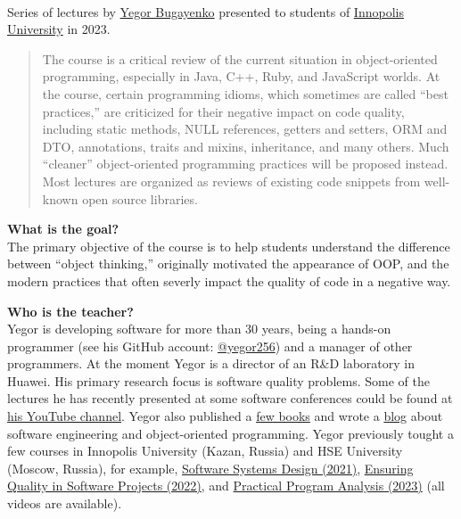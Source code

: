 \documentclass[nobrand,anonymous,nodate,nosecurity]{huawei}
\begin{document}
{\\
Series of lectures by \href{https://www.yegor256.com}{Yegor Bugayenko} presented
to students of \href{https://innopolis.university/en/}{Innopolis University} in 2023.


\begin{abstract}
The course is a critical review of the current situation in object-oriented programming,
especially in Java, C++, Ruby, and JavaScript worlds. At the course, certain programming
idioms, which sometimes are called ``best practices,'' are criticized for their
negative impact on code quality, including static methods, NULL references, getters
and setters, ORM and DTO, annotations, traits and mixins, inheritance, and many others.
Much ``cleaner'' object-oriented programming practices will be proposed instead. Most
lectures are organized as reviews of existing code snippets from well-known
open source libraries.
\end{abstract}


\textbf{What is the goal?}\\
The primary objective of the course is to help students understand the
difference between ``object thinking,'' originally motivated the
appearance of OOP, and the modern practices that often
severly impact the quality of code in a negative way.

\textbf{Who is the teacher?}\\
Yegor is developing software for more than 30 years, being a hands-on programmer
(see his GitHub account: \href{https://github.com/yegor256}{@yegor256})
and a manager of other programmers. At the moment Yegor is a director
of an R\&D laboratory in Huawei. His primary research focus is
software quality problems. Some of the lectures he has recently presented
at some software conferences could be found at
\href{https://www.youtube.com/channel/UCr9qCdqXLm2SU0BIs6d_68Q}{his YouTube channel}.
Yegor also published a \href{https://www.yegor256.com/books.html}{few books}
and wrote a \href{https://www.yegor256.com/contents.html}{blog} about software engineering
and object-oriented programming.
Yegor previously tought a few courses in
Innopolis University (Kazan, Russia)
and HSE University (Moscow, Russia),
for example,
\href{https://github.com/yegor256/ssd16}{Software Systems Design (2021)},
\href{https://github.com/yegor256/eqsp}{Ensuring Quality in Software Projects (2022)},
and
\href{https://github.com/yegor256/ppa}{Practical Program Analysis (2023)}
(all videos are available).

}
\end{document}
